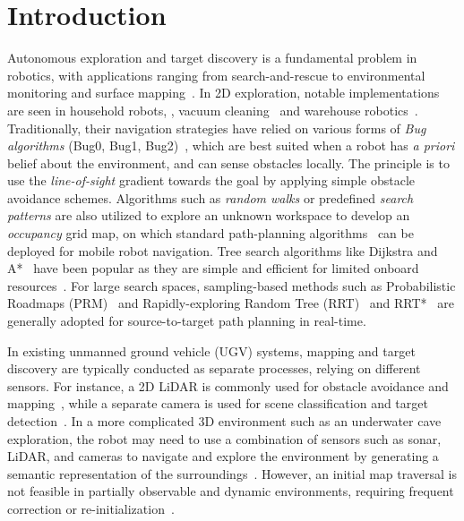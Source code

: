 \section{Introduction}
Autonomous exploration and target discovery is a fundamental problem in robotics, with applications ranging from search-and-rescue to environmental monitoring and surface mapping~\cite{wang2019autonomous,lluvia2021active}. In 2D exploration, notable implementations are seen in household robots, \eg, vacuum cleaning~\cite{hasan2014path,stachniss2009robotic} and warehouse robotics~\cite{gadd2015framework,keith2024review}. Traditionally, their navigation strategies have relied on various forms of \textit{Bug algorithms} (Bug0, Bug1, Bug2)~\cite{lumelsky1986dynamic,lumelsky1987path}, which are best suited when a robot has \textit{a priori} belief about the environment, and can sense obstacles locally. The principle is to use the \textit{line-of-sight} gradient towards the goal by applying simple obstacle avoidance schemes. Algorithms such as \textit{random walks} or predefined \textit{search patterns} are also utilized to explore an unknown workspace to develop an \textit{occupancy} grid map, on which standard path-planning algorithms~\cite{wang2017autonomous,amigoni2010information} can be deployed for mobile robot navigation. Tree search algorithms like Dijkstra and A*~\cite{candra2020dijkstra} have been popular as they are simple and efficient for limited onboard resources~\cite{xu2017mobile}. For large search spaces, sampling-based methods such as Probabilistic Roadmaps (PRM)~\cite{kavraki1998analysis} and Rapidly-exploring Random Tree (RRT)~\cite{li2021adaptive} and RRT*~\cite{karaman2011sampling} are generally adopted for source-to-target path planning in real-time.

In existing unmanned ground vehicle (UGV) systems, mapping and target discovery are typically conducted as separate processes, relying on different sensors. For instance, a 2D LiDAR is commonly used for obstacle avoidance and mapping~\cite{sun2023autonomous,peng2015obstacle}, while a separate camera is used for scene classification and target detection~\cite{kim2022autonomous}. In a more complicated 3D environment such as an underwater cave exploration, the robot may need to use a combination of sensors such as sonar, LiDAR, and cameras to navigate and explore the environment by generating a semantic representation of the surroundings~\cite{abdullah2023caveseg,rahman2022svin2}. However, an initial map traversal is not feasible in partially observable and dynamic environments, requiring frequent correction or re-initialization~\cite{hernandez2020real,bonnevie2021long}. 



